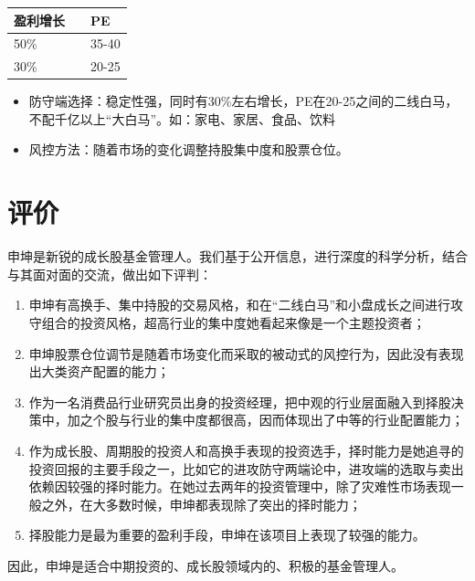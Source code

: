 \documentclass[hyperref,]{ctexart}
\providecommand{\tightlist}{%
  \setlength{\itemsep}{0pt}\setlength{\parskip}{0pt}}
\begin{document}
\begin{longtable}[]{@{}ll@{}}
\toprule
盈利增长　 & PE\tabularnewline
\midrule
\endhead
50\% & 35-40\tabularnewline
30\% & 20-25\tabularnewline
\bottomrule
\end{longtable}

\begin{itemize}
\item
  防守端选择：稳定性强，同时有30\%左右增长，PE在20-25之间的二线白马，不配千亿以上``大白马''。如：家电、家居、食品、饮料
\item
  风控方法：随着市场的变化调整持股集中度和股票仓位。
\end{itemize}

\section{评价}

申坤是新锐的成长股基金管理人。我们基于公开信息，进行深度的科学分析，结合与其面对面的交流，做出如下评判：

\begin{enumerate}
\def\labelenumi{\arabic{enumi}.}
\tightlist
\item
  申坤有高换手、集中持股的交易风格，和在``二线白马''和小盘成长之间进行攻守组合的投资风格，超高行业的集中度她看起来像是一个主题投资者；
\item
  申坤股票仓位调节是随着市场变化而采取的被动式的风控行为，因此没有表现出大类资产配置的能力；
\item
  作为一名消费品行业研究员出身的投资经理，把中观的行业层面融入到择股决策中，加之个股与行业的集中度都很高，因而体现出了中等的行业配置能力；
\item
  作为成长股、周期股的投资人和高换手表现的投资选手，择时能力是她追寻的投资回报的主要手段之一，比如它的进攻防守两端论中，进攻端的选取与卖出依赖因较强的择时能力。在她过去两年的投资管理中，除了灾难性市场表现一般之外，在大多数时候，申坤都表现除了突出的择时能力；
\item
  择股能力是最为重要的盈利手段，申坤在该项目上表现了较强的能力。
\end{enumerate}

因此，申坤是适合中期投资的、成长股领域内的、积极的基金管理人。
\end{document}
